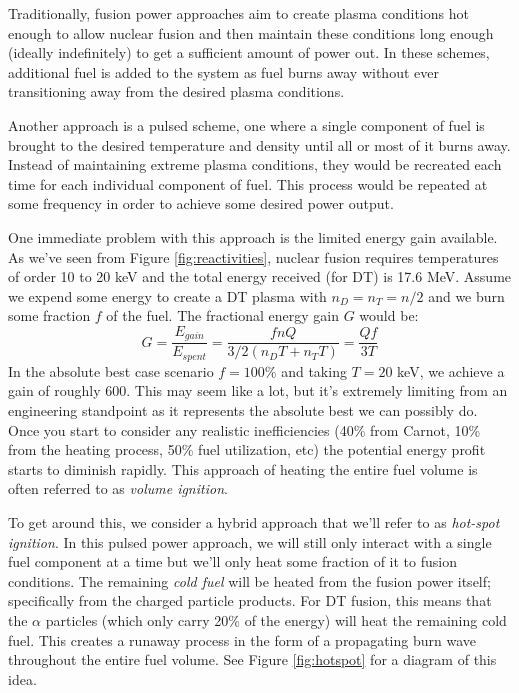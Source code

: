 Traditionally, fusion power approaches aim to create plasma conditions hot enough to allow nuclear fusion and then maintain these conditions long enough (ideally indefinitely) to get a sufficient amount of power out. In these schemes, additional fuel is added to the system as fuel burns away without ever transitioning away from the desired plasma conditions. 

Another approach is a pulsed scheme, one where a single component of fuel is brought to the desired temperature and density until all or most of it burns away. Instead of maintaining extreme plasma conditions, they would be recreated each time for each individual component of fuel. This process would be repeated at some frequency in order to achieve some desired power output.

One immediate problem with this approach is the limited energy gain available. As we've seen from Figure \ref{fig:reactivities}, nuclear fusion requires temperatures of order 10 to 20 keV and the total energy received (for DT) is 17.6 MeV. Assume we expend some energy to create a DT plasma with $n_D=n_T=n/2$ and we burn some fraction $f$ of the fuel. The fractional energy gain $G$ would be:
%
\begin{equation}
	G = \frac{E_{gain}}{E_{spent}} = \frac{fnQ}{3/2\left(n_DT + n_TT\right)} = \frac{Qf}{3T}
\end{equation}
%
In the absolute best case scenario $f=100\%$ and taking $T=20$ keV, we achieve a gain of roughly 600. This may seem like a lot, but it's extremely limiting from an engineering standpoint as it represents the absolute best we can possibly do. Once you start to consider any realistic inefficiencies (40\% from Carnot, 10\% from the heating process, 50\% fuel utilization, etc) the potential energy profit starts to diminish rapidly. This approach of heating the entire fuel volume is often referred to as \emph{volume ignition}.

To get around this, we consider a hybrid approach that we'll refer to as \emph{hot-spot ignition}. In this pulsed power approach, we will still only interact with a single fuel component at a time but we'll only heat some fraction of it to fusion conditions. The remaining \emph{cold fuel} will be heated from the fusion power itself; specifically from the charged particle products. For DT fusion, this means that the $\alpha$ particles (which only carry 20\% of the energy) will heat the remaining cold fuel. This creates a runaway process in the form of a propagating burn wave throughout the entire fuel volume. See Figure \ref{fig:hotspot} for a diagram of this idea.

